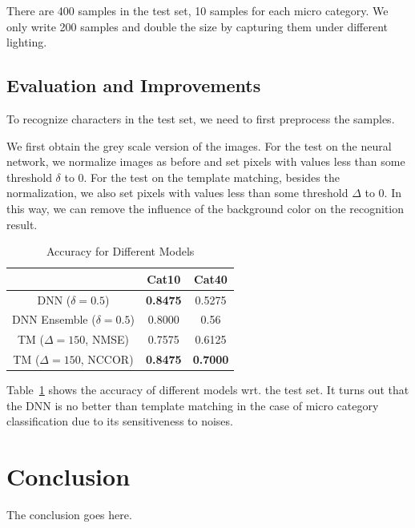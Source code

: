 \documentclass[journal]{IEEEtran}
\begin{document}
There are 400 samples in the test set, 10 samples for each micro category.
We only write 200 samples and double the size by capturing them under different lighting.

\subsection{Evaluation and Improvements}
To recognize characters in the test set, we need to first preprocess the samples.

We first obtain the grey scale version of the images.
For the test on the neural network, we normalize images as before and set pixels with values less than some threshold $\delta$ to 0.
For the test on the template matching, besides the normalization, we also set pixels with values less than some threshold $\Delta$ to 0.
In this way, we can remove the influence of the background color on the recognition result.

\begin{table}[h]
	\centering
	\caption{Accuracy for Different Models}
	\label{tab:result}
	\begin{tabular}{|c|c|c|}
		\hline
		                            & Cat10  & Cat40  \\\hline
		DNN ($\delta=0.5$)          & \textbf{0.8475} & 0.5275 \\\hline
		DNN Ensemble ($\delta=0.5$) & 0.8000 & 0.56   \\\hline
		TM ($\Delta=150$, NMSE)     & 0.7575 & 0.6125 \\\hline
		TM ($\Delta=150$, NCCOR)    & \textbf{0.8475} & \textbf{0.7000} \\\hline
	\end{tabular}
\end{table}

Table~\ref{tab:result} shows the accuracy of different models wrt. the test set.
It turns out that the DNN is no better than template matching in the case of micro category classification due to its sensitiveness to noises.

\section{Conclusion}
The conclusion goes here.





\end{document}
